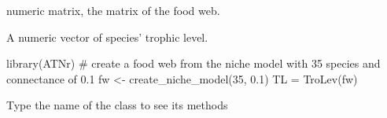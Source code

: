 \documentclass[letterpaper]{book}
\begin{document}
%
\begin{Arguments}
\begin{ldescription}
\item[\code{fw}] numeric matrix, the matrix of the food web.
\end{ldescription}
\end{Arguments}
%
\begin{Value}
A numeric vector of species' trophic level.
\end{Value}
%
\begin{Examples}
\begin{ExampleCode}
library(ATNr)
# create a food web from the niche model with 35 species and connectance of 0.1
fw <- create_niche_model(35, 0.1)
TL = TroLev(fw)
 

\end{ExampleCode}
\end{Examples}
%
\begin{Description}\relax
Type the name of the class to see its methods
\end{Description}
%
\end{document}
